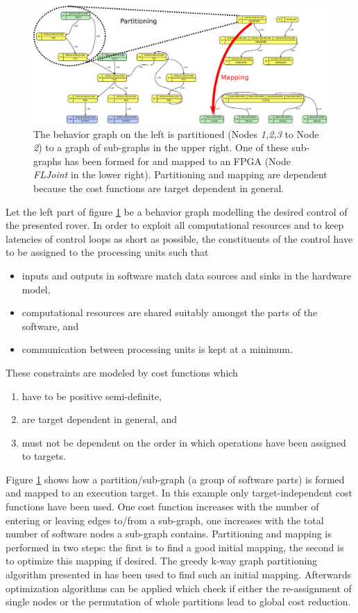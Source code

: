 \documentclass[a4paper,twocolumn]{esapub2005} %
\begin{document}
\begin{figure}[t]
    \centering
    \includegraphics[width=.45\textwidth]{pics/PartAndMap.png}
    \caption{
        The behavior graph on the left is partitioned (Nodes \emph{1,2,3} to
        Node \emph{2}) to a graph of sub-graphs in the upper right.
        One of these sub-graphs has been formed for and mapped to an FPGA (Node \emph{FLJoint} in the lower right).
        Partitioning and mapping are dependent because the cost functions are target dependent in general.
    }
    \label{fig:PartAndMap}
\end{figure}
Let the left part of figure \ref{fig:PartAndMap} be a behavior graph modelling the desired control of the presented rover.
In order to exploit all computational resources and to keep latencies of control loops as short as possible,
the constituents of the control have to be assigned to the processing units such that
\begin{itemize}
    \item inputs and outputs in software match data sources and sinks in the hardware model,
    \item computational resources are shared suitably amongst the parts of the software, and
    \item communication between processing units is kept at a minimum.
\end{itemize}
These constraints are modeled by cost functions which
\begin{enumerate}
    \item have to be positive semi-definite,
    \item are target dependent in general, and
    \item must not be dependent on the order in which operations have been assigned to targets.
\end{enumerate}
Figure \ref{fig:PartAndMap} shows how a partition/sub-graph (a group of software parts) is formed and mapped to an execution target.
In this example only target-independent cost functions have been used.
One cost function increases with the number of entering or leaving edges to/from a sub-graph,
one increases with the total number of software nodes a sub-graph contains.
Partitioning and mapping is performed in two steps:
the first is to find a good initial mapping, the second is to optimize this mapping if desired.
The greedy k-way graph partitioning algorithm presented in \cite{2000_Jain} has been used to find such an initial mapping.
Afterwards optimization algorithms can be applied which check if either the re-assignment of single nodes or the permutation of whole partitions lead to global cost reduction.
\end{document}

